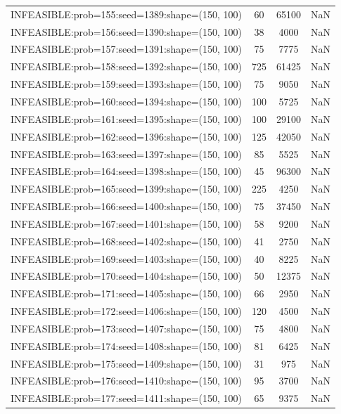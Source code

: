 \begin{longtable}{lccc}
INFEASIBLE:prob=155:seed=1389:shape=(150, 100) &    60 & 65100 &    NaN \\
INFEASIBLE:prob=156:seed=1390:shape=(150, 100) &    38 &  4000 &    NaN \\
INFEASIBLE:prob=157:seed=1391:shape=(150, 100) &    75 &  7775 &    NaN \\
INFEASIBLE:prob=158:seed=1392:shape=(150, 100) &   725 & 61425 &    NaN \\
INFEASIBLE:prob=159:seed=1393:shape=(150, 100) &    75 &  9050 &    NaN \\
INFEASIBLE:prob=160:seed=1394:shape=(150, 100) &   100 &  5725 &    NaN \\
INFEASIBLE:prob=161:seed=1395:shape=(150, 100) &   100 & 29100 &    NaN \\
INFEASIBLE:prob=162:seed=1396:shape=(150, 100) &   125 & 42050 &    NaN \\
INFEASIBLE:prob=163:seed=1397:shape=(150, 100) &    85 &  5525 &    NaN \\
INFEASIBLE:prob=164:seed=1398:shape=(150, 100) &    45 & 96300 &    NaN \\
INFEASIBLE:prob=165:seed=1399:shape=(150, 100) &   225 &  4250 &    NaN \\
INFEASIBLE:prob=166:seed=1400:shape=(150, 100) &    75 & 37450 &    NaN \\
INFEASIBLE:prob=167:seed=1401:shape=(150, 100) &    58 &  9200 &    NaN \\
INFEASIBLE:prob=168:seed=1402:shape=(150, 100) &    41 &  2750 &    NaN \\
INFEASIBLE:prob=169:seed=1403:shape=(150, 100) &    40 &  8225 &    NaN \\
INFEASIBLE:prob=170:seed=1404:shape=(150, 100) &    50 & 12375 &    NaN \\
INFEASIBLE:prob=171:seed=1405:shape=(150, 100) &    66 &  2950 &    NaN \\
INFEASIBLE:prob=172:seed=1406:shape=(150, 100) &   120 &  4500 &    NaN \\
INFEASIBLE:prob=173:seed=1407:shape=(150, 100) &    75 &  4800 &    NaN \\
INFEASIBLE:prob=174:seed=1408:shape=(150, 100) &    81 &  6425 &    NaN \\
INFEASIBLE:prob=175:seed=1409:shape=(150, 100) &    31 &   975 &    NaN \\
INFEASIBLE:prob=176:seed=1410:shape=(150, 100) &    95 &  3700 &    NaN \\
INFEASIBLE:prob=177:seed=1411:shape=(150, 100) &    65 &  9375 &    NaN \\

\end{longtable}
